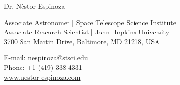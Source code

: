 \documentclass[12pt, a4paper]{article} %
\begin{document}

{\LARGE Dr. N\'estor Espinoza}\\[0.2cm] %
\begin{minipage}[t]{0.63\textwidth}
Associate Astronomer | Space Telescope Science Institute\\
Associate Research Scientist | John Hopkins University\\
3700 San Martin Drive, Baltimore, MD 21218, USA \\
\end{minipage}
\begin{minipage}[t]{0.37\textwidth}
E-mail: \href{mailto:nespinoza@stsci.edu}{nespinoza@stsci.edu}\\
Phone: +1 (419) 338 4331\\ 
\url{www.nestor-espinoza.com}
\end{minipage}

\hrulefill
\end{document}
